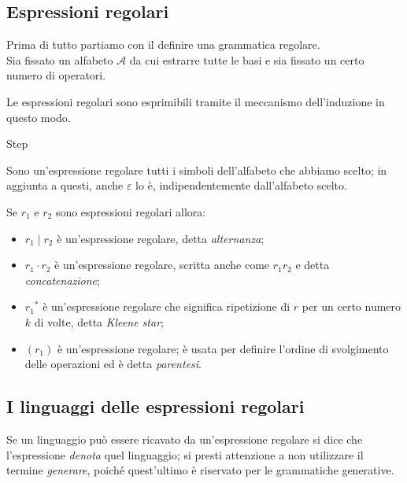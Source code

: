 \documentclass[class=book, crop=false, oneside, 12pt]{standalone}
\begin{document}
\subsection{Espressioni regolari}
Prima di tutto partiamo con il definire una grammatica regolare.\\
Sia fissato un alfabeto \(\mathcal{A}\) da cui estrarre tutte le basi e sia fissato un certo numero di operatori.

Le espressioni regolari sono esprimibili tramite il meccanismo dell'induzione in questo modo.
\begin{labeling}{Step}
    \item[Base] Sono un'espressione regolare tutti i simboli dell’alfabeto che abbiamo scelto; in aggiunta a questi, anche \(\varepsilon\) lo è, indipendentemente dall'alfabeto scelto.
    \item[Step] Se \(r_1\) e \(r_2\) sono espressioni regolari allora:
    \begin{itemize}
        \item \(r_1 \mid r_2\) è un’espressione regolare, detta \emph{alternanza};
        \item \(r_1 \cdot r_2\) è un’espressione regolare, scritta anche come \(r_1 r_2\) e detta \emph{concatenazione};
        \item \(r_1\)\(^\ast\) è un’espressione regolare che significa ripetizione di \(r\) per un certo numero \(k\) di volte, detta \emph{Kleene star};
        \item \((r_1)\) è un’espressione regolare; è usata per definire l’ordine di svolgimento delle operazioni ed è detta \emph{parentesi}.
    \end{itemize} 
\end{labeling}

\subsection{I linguaggi delle espressioni regolari}
Se un linguaggio può essere ricavato da un'espressione regolare si dice che l'espressione \emph{denota} quel linguaggio; si presti attenzione a non utilizzare il termine \emph{generare}, poiché quest'ultimo è riservato per le grammatiche generative.
\end{document}
